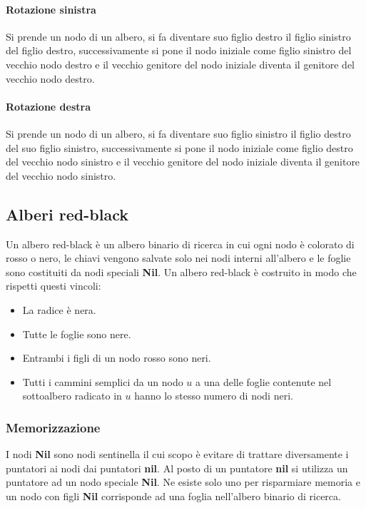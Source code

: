 \paragraph{Rotazione sinistra}
Si prende un nodo di un albero, si fa diventare suo figlio destro il figlio sinistro del figlio destro, successivamente si pone il nodo iniziale come figlio 
sinistro del vecchio nodo destro e il vecchio genitore del nodo iniziale diventa il genitore del vecchio nodo destro.
\paragraph{Rotazione destra}
Si prende un nodo di un albero, si fa diventare suo figlio sinistro il figlio destro del suo figlio sinistro, successivamente si pone il nodo iniziale come
figlio destro del vecchio nodo sinistro e il vecchio genitore del nodo iniziale diventa il genitore del vecchio nodo sinistro.
\begin{multicols}{2}

\columnbreak

\end{multicols}

\subsection{Alberi red-black}
Un albero red-black \`e un albero binario di ricerca in cui ogni nodo \`e colorato di rosso o nero, le chiavi vengono salvate solo nei nodi interni 
all'albero e le foglie sono costituiti da nodi speciali \textbf{Nil}. Un albero red-black \`e costruito in modo che rispetti questi vincoli: 
\begin{itemize}
\item La radice \`e nera.
\item Tutte le foglie sono nere.
\item Entrambi i figli di un nodo rosso sono neri.
\item Tutti i cammini semplici da un nodo $u$ a una delle foglie contenute nel sottoalbero radicato in $u$ hanno lo stesso numero di nodi neri.
\end{itemize}
\subsubsection{Memorizzazione}
\begin{multicols}{2}

\columnbreak
I nodi \textbf{Nil} sono nodi sentinella il cui scopo \`e evitare di trattare diversamente i puntatori ai nodi dai puntatori \textbf{nil}. Al posto di un
puntatore \textbf{nil} si utilizza un puntatore ad un nodo speciale \textbf{Nil}. Ne esiste solo uno per risparmiare memoria e un nodo con figli 
\textbf{Nil} corrisponde ad una foglia nell'albero binario di ricerca.
\end{multicols}
